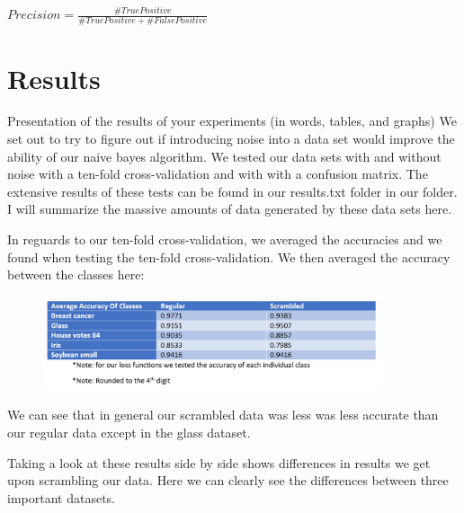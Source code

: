 \documentclass[twoside,11pt]{article}
\begin{document}
\begin{center}
    $Precision = \frac{\#TruePositive}{\#TruePositive + \#FalsePositive}$\\
\end{center}

\section{Results}

Presentation of the results of your experiments (in words, tables, and graphs)
We set out to try to figure out if introducing noise into a data set would improve the ability of our naive bayes algorithm. We tested our data sets with and without noise with a ten-fold cross-validation and with with a confusion matrix. The extensive results of these tests can be found in our results.txt folder in our folder. I will summarize the massive amounts of data generated by these data sets here.

In reguards to our ten-fold cross-validation, we averaged the accuracies and we found when testing the ten-fold cross-validation. We then averaged the accuracy between the classes here:


\begin{figure}[htp]
    \centering
    \includegraphics[width=10cm]{table1Accuracy.png}
\end{figure}


We can see that in general our scrambled data was less was less accurate than our regular data except in the glass dataset.

Taking a look at these results side by side shows differences in results we get upon scrambling our data. Here we can clearly see the differences between three important datasets.
\end{document}
